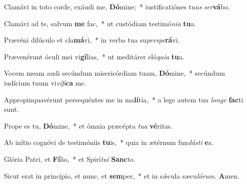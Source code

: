 \item Clamávi in toto corde, exáudi me, \textbf{Dó}mine;~* iustificatiónes tu\textit{as} \textit{ser}\textbf{vá}bo.

\item Clamávi ad te, salvum \textbf{me} fac,~* ut custódiam testimó\textit{nia} \textbf{tu}a.

\item Prævéni dilúculo et cla\textbf{má}vi,~* in verba tua su\textit{perspe}\textbf{rá}vi.

\item Prævenérunt óculi mei vi\textbf{gí}lias,~* ut meditárer eló\textit{quia} \textbf{tu}a.

\item Vocem meam audi secúndum misericórdiam tuam, \textbf{Dó}mine,~* secúndum iudícium tuum vi\textit{vífi}\textbf{ca} me.

\item Appropinquavérunt persequéntes me in ma\textbf{lí}tia,~* a lege autem tua \textit{longe} \textbf{fac}ti sunt.

\item Prope es tu, \textbf{Dó}mine,~* et ómnia præcépta \textit{tua} \textbf{vé}ritas.

\item Ab inítio cognóvi de testimóniis \textbf{tu}is,~* quia in ætérnum fun\textit{dásti} \textbf{e}a.

\item Glória Patri, et \textbf{Fí}lio,~* et Spirí\textit{tui} \textbf{Sanc}to.

\item Sicut erat in princípio, et nunc, et \textbf{sem}per,~* et in sǽcula sæcu\textit{lórum}. \textbf{A}men.